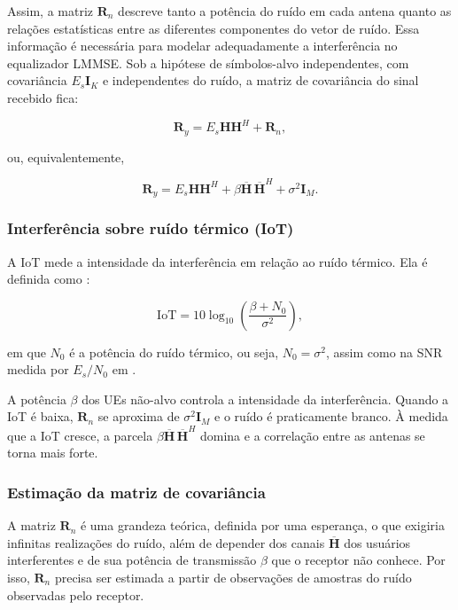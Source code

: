 Assim, a matriz $\mathbf R_n$ descreve tanto a potência do ruído em cada antena quanto as relações estatísticas entre as diferentes componentes do vetor de ruído. Essa informação é necessária para modelar adequadamente a interferência no equalizador LMMSE. Sob a hipótese de símbolos-alvo independentes, com covariância $E_s\mathbf I_K$ e independentes do ruído, a matriz de covariância do sinal recebido fica:

\[
\mathbf R_y=
E_s\mathbf H\mathbf H^H+\mathbf R_n,
\]

ou, equivalentemente,

\[
\mathbf R_y=
E_s\mathbf H\mathbf H^H+
\beta\overline{\mathbf H}\,\overline{\mathbf H}^H
+\sigma^2\mathbf I_M.
\]



\subsubsection{Interferência sobre ruído térmico (IoT)}
A IoT mede a intensidade da interferência em relação ao ruído térmico. Ela é definida como \cite{zhao2025jsac}:

\begin{equation}
\mathrm{IoT}=10\log_{10}\left(\frac{\beta+N_0}{\sigma^2}\right),\label{eq:iot}
\end{equation}

em que $N_0$ é a potência do ruído térmico, ou seja, $N_0=\sigma^2$, assim como na SNR medida por $E_s/N_0$ em \cite{zhao2021-globecom}.

A potência $\beta$ dos UEs não-alvo controla a intensidade da interferência. Quando a IoT é baixa, $\mathbf R_n$ se aproxima de $\sigma^2\mathbf I_M$ e o ruído é praticamente branco. À medida que a IoT cresce, a parcela $\beta\overline{\mathbf H}\,\overline{\mathbf H}^H$ domina e a correlação entre as antenas se torna mais forte.

\subsubsection{Estimação da matriz de covariância}\label{subsubsec:estimacao-R}
A matriz $\mathbf R_n$ é uma grandeza teórica, definida por uma esperança, o que exigiria infinitas realizações do ruído, além de depender dos canais $\overline{\mathbf H}$ dos usuários interferentes e de sua potência de transmissão $\beta$ que o receptor não conhece. Por isso, $\mathbf R_n$ precisa ser estimada a partir de observações de amostras do ruído observadas pelo receptor.

